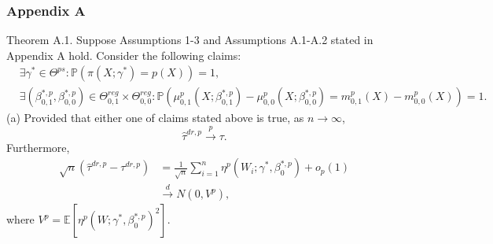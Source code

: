 \documentclass{beamer}
\begin{document}
\begin{frame}\frametitle{Appendix A}
    \footnotesize
    \begin{block}{Theorem A.1.}
        Suppose Assumptions 1-3 and Assumptions A.1-A.2 stated in Appendix A hold.
        Consider the following claims:
        \footnotesize
        \begin{align*}
            &\exists \gamma^{\ast} \in \Theta^{ps}:\mathbb{P}(\pi(X;\gamma^{\ast}) =p(X)) = 1,\\
            &\exists (\beta^{\ast, p}_{0,1}, \beta^{\ast, p}_{0,0}) \in \Theta^{reg}_{0,1} \times \Theta^{reg}_{0,0}:\mathbb{P}(\mu^{p}_{0,1}(X;\beta^{\ast,p}_{0,1}) - \mu^{p}_{0,0}(X;\beta^{\ast,p}_{0,0}) = m^{p}_{0,1}(X) - m^{p}_{0,0}(X)) = 1.
        \end{align*}
        \normalsize
        \footnotesize
        (a) Provided that either one of claims stated above is true, as $n \to \infty$,
        \begin{equation*}
            \widehat{\tau}^{dr,p} \overset{p}{\to} \tau.
        \end{equation*}
        Furthermore,
        \normalsize
        \footnotesize
        \begin{align*}
            \sqrt{n}(\widehat{\tau}^{dr,p} - \tau^{dr,p}) &= \frac{1}{\sqrt{n}}\sum_{i = 1}^{n}\eta^{p}(W_{i};\gamma^{\ast},\beta^{\ast,p}_{0}) + o_{p}(1)
            \\& \overset{d}{\to} N(0,V^{p}),
        \end{align*}
        where $V^{p} = \mathbb{E}[\eta^{p}(W;\gamma^{\ast},\beta^{\ast,p}_{0})^{2}]$.
        \normalsize
    \end{block}
    \normalsize
\end{frame}
\end{document}
